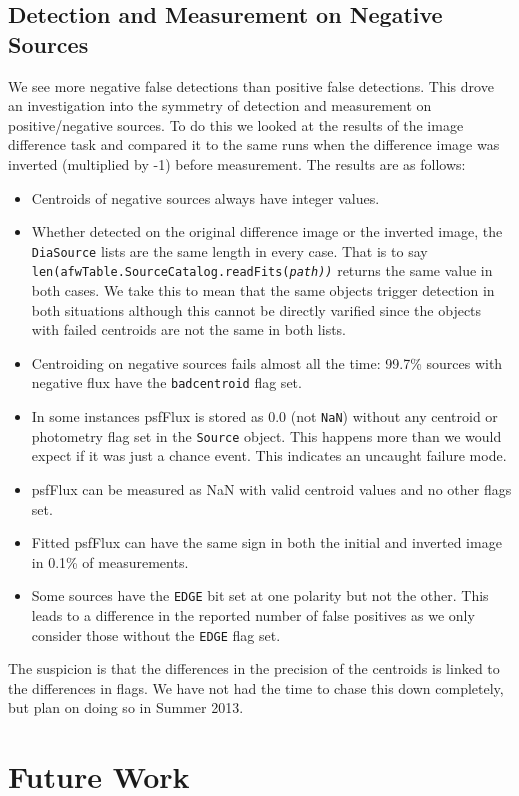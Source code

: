 \documentclass[prd, nofootinbib, floatfix, 11pt,tightenlines,times]{article}
\begin{document}
\subsection{Detection and Measurement on Negative Sources}
We see more negative false detections than positive false detections.  This drove an investigation 
into the symmetry of detection and measurement on positive/negative sources.  To do this we looked at the 
results of the image difference task and compared it to the same runs when the difference image was inverted
(multiplied by -1) before measurement.  The results are as follows:
\begin{itemize}
\item Centroids of negative sources always have integer values.
\item Whether detected on the original difference image or the inverted image, the {\tt DiaSource} lists are the same length in every
case.  That is to say {\tt len(afwTable.SourceCatalog.readFits(\it{path}))} returns the same value in both cases.  We take this to mean
that the same objects trigger detection in both situations although this cannot be directly varified since the objects with failed centroids are
not the same in both lists.  
\item Centroiding on negative sources fails almost all the time: 99.7\% sources with negative flux
have the {\tt badcentroid} flag set.
\item In some instances psfFlux is stored as 0.0 (not {\tt NaN}) without any centroid or photometry flag set in the {\tt Source} object.  This
happens more than we would expect if it was just a chance event.  This indicates an uncaught failure mode.
\item psfFlux can be measured as NaN with valid centroid values and no other flags set.
\item Fitted psfFlux can have the same sign in both the initial and inverted image in 0.1\% of measurements.
\item Some sources have the {\tt EDGE} bit set at one polarity but not the other.  
  This leads to a difference in the reported number of false positives as we only consider 
  those without the {\tt EDGE} flag set.
\end{itemize}

The suspicion is that the differences in the precision of the centroids is linked to the differences in flags.
We have not had the time to chase this down completely, but plan on doing so in Summer 2013.


\section{Future Work}
\end{document}
